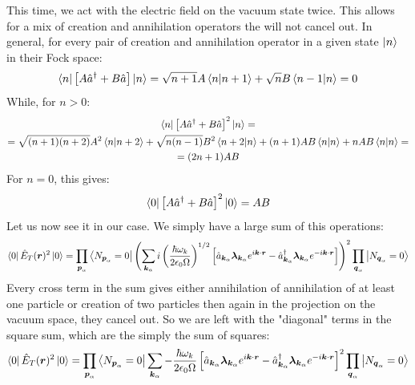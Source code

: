 \documentclass{article}
\begin{document}
This time, we act with the electric field on the vacuum state twice. This allows for a mix of creation and annihilation operators the will not cancel out. In general, for every pair of creation and annihilation operator in a given state $\ket{n}$ in their Fock space:
\begin{equation}
    \bra{n}\left[A\hat{a}^\dagger + B\hat{a}\right]\ket{n} = \sqrt{n+1}A \braket{n}{n+1} + \sqrt{n}B \braket{n-1}{n} = 0
\end{equation}
While, for $n > 0$:
\begin{equation}
\begin{gathered}
    \bra{n}\left[A\hat{a}^\dagger + B\hat{a}\right]^2\ket{n} = \\ = \sqrt{(n+1)(n+2)}A^2\braket{n}{n+2} + \sqrt{n(n-1)}B^2\braket{n+2}{n} + (n+1)AB\braket{n}{n} + n AB\braket{n}{n} = \\ = (2n+1)AB
\end{gathered}
\end{equation}
For $n = 0$, this gives:
\begin{equation}
    \bra{0}\left[A\hat{a}^\dagger + B\hat{a}\right]^2\ket{0} = AB
\end{equation}
Let us now see it in our case. We simply have a large sum of this operations:
\begin{equation}
    \bra{0}\hat{E}_T(\boldsymbol{r})^2\ket{0} = \prod_{\boldsymbol{p}_\alpha} \bra{N_{\boldsymbol{p}_\alpha} = 0}
    \left(
        \sum_{\boldsymbol{k}_\alpha} i \left(\frac{\hbar \omega_k}{2\epsilon_0\Omega}\right)^{1/2}\left[
        \hat{a}_{\boldsymbol{k}_\alpha}\boldsymbol{\lambda}_{\boldsymbol{k}_\alpha} e^{i\boldsymbol{k}\cdot\boldsymbol{r}}
        -
        \hat{a}_{\boldsymbol{k}_\alpha}^\dagger\boldsymbol{\lambda}_{\boldsymbol{k}_\alpha} e^{-i\boldsymbol{k}\cdot\boldsymbol{r}}
    \right]
    \right)^2 \prod_{\boldsymbol{q}_\alpha} \ket{N_{\boldsymbol{q}_\alpha} = 0}
\end{equation}
Every cross term in the sum gives either annihilation of annihilation of at least one particle or creation of two particles then again in the projection on the vacuum space, they cancel out. So we are left with the "diagonal" terms in the square sum, which are the simply the sum of squares:
\begin{equation}
    \bra{0}\hat{E}_T(\boldsymbol{r})^2\ket{0} = \prod_{\boldsymbol{p}_\alpha} \bra{N_{\boldsymbol{p}_\alpha} = 0}
    \sum_{\boldsymbol{k}_\alpha} - \frac{\hbar \omega_k}{2\epsilon_0\Omega}\left[
        \hat{a}_{\boldsymbol{k}_\alpha}\boldsymbol{\lambda}_{\boldsymbol{k}_\alpha} e^{i\boldsymbol{k}\cdot\boldsymbol{r}}
        -
        \hat{a}_{\boldsymbol{k}_\alpha}^\dagger\boldsymbol{\lambda}_{\boldsymbol{k}_\alpha} e^{-i\boldsymbol{k}\cdot\boldsymbol{r}}
    \right]^2
     \prod_{\boldsymbol{q}_\alpha} \ket{N_{\boldsymbol{q}_\alpha} = 0}
\end{equation}
\end{document}
